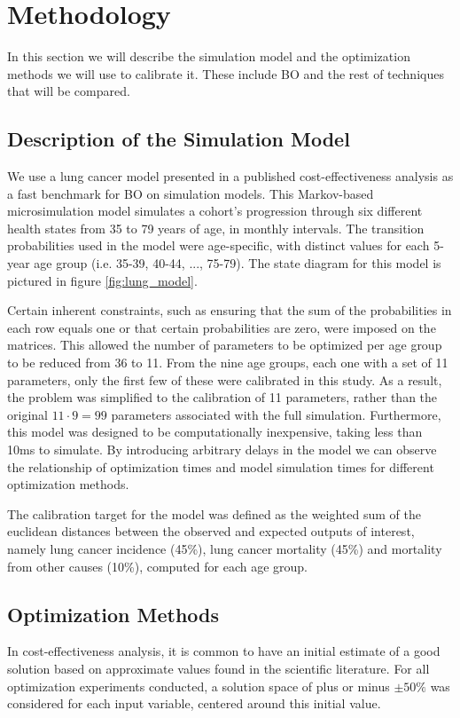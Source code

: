 \documentclass{IOS-Book-Article}
\begin{document}
	\section{Methodology}
	In this section we will describe the simulation model and the optimization methods we will use to calibrate it. These include BO and the rest of techniques that will be compared.
	
	\subsection{Description of the Simulation Model}
	We use a lung cancer model presented in a published cost-effectiveness analysis\cite{lung-model} as a fast benchmark for BO on simulation models. This Markov-based microsimulation model simulates a cohort's progression through six different health states from 35 to 79 years of age, in monthly intervals. The transition probabilities used in the model were age-specific, with distinct values for each 5-year age group (i.e. 35-39, 40-44, ..., 75-79). The state diagram for this model is pictured in figure \ref{fig:lung_model}.
	
	Certain inherent constraints, such as ensuring that the sum of the probabilities in each row equals one or that certain probabilities are zero, were imposed on the matrices. This allowed the number of parameters to be optimized per age group to be reduced from 36 to 11. From the nine age groups, each one with a set of 11 parameters, only the first few of these were calibrated in this study. As a result, the problem was simplified to the calibration of 11 parameters, rather than the original $11\cdot 9=99$ parameters associated with the full simulation. Furthermore, this model was designed to be computationally inexpensive, taking less than 10ms to simulate. By introducing arbitrary delays in the model we can observe the relationship of optimization times and model simulation times for different optimization methods.
	
	The calibration target for the model was defined as the weighted sum of the euclidean distances between the observed and expected outputs of interest, namely lung cancer incidence (45\%), lung cancer mortality (45\%) and mortality from other causes (10\%), computed for each age group.
	
	\subsection{Optimization Methods}
	In cost-effectiveness analysis, it is common to have an initial estimate of a good solution based on approximate values found in the scientific literature. For all optimization experiments conducted, a solution space of plus or minus $\pm 50\%$ was considered for each input variable, centered around this initial value.
	
\end{document}

